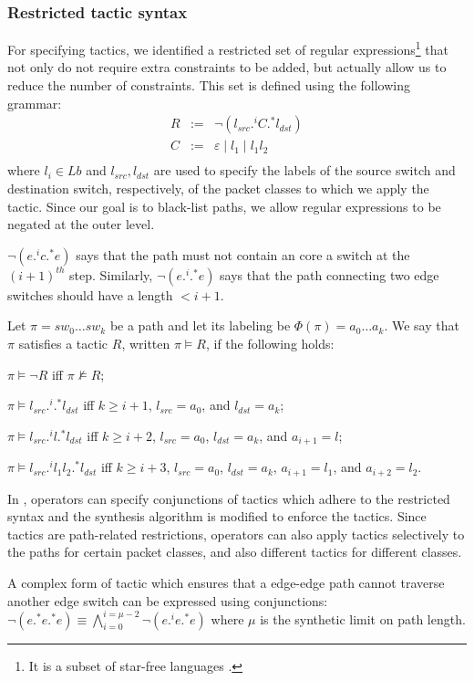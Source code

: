 \subsubsection{Restricted tactic syntax} 
For specifying tactics, we identified a restricted set of regular expressions\footnote{
	It is a subset of star-free languages \cite{}.}
 that not only do not require extra constraints to be added,
but actually allow us to reduce the number of constraints. 
This set is defined using the following grammar:
$$\begin{array}{rcl}
R  &  :=  &  \neg (l_{src} .^i C .^* l_{dst}) \\
C  &  :=  &  \varepsilon \mid l_1 \mid l_1 l_2\\
\end{array}$$
where $l_i\in Lb$ and $l_{src}, l_{dst}$ are used to specify the labels of the source switch 
and destination switch, respectively, of the packet classes to which we apply the tactic. 
Since our goal is to black-list paths, we allow regular expressions to be negated at the outer level. 
\begin{example}
 $\neg (e .^i c .^* e)$ says that the path must not contain an core a switch at the $(i+1)^{th}$ step. 
 Similarly, $\neg (e .^i .^* e)$ says that the path connecting two edge switches should have a length $ < i + 1$. 
\end{example}


Let $\pi = sw_0\ldots sw_k$ be a path and 
let its labeling be $\Phi(\pi)= a_0\ldots a_k$.
We say that $\pi$ satisfies a tactic $R$, written $\pi\models R$, if the following
holds:
\begin{compact2itemize}
\item $\pi \models \neg R$ iff $\pi \not\models R$;
\item $\pi \models  l_{src} .^i .^* l_{dst}$ iff $k\geq i+1$, $l_{src}= a_0$, and $l_{dst}= a_k$; 
\item $\pi \models  l_{src} .^i l.^* l_{dst}$ iff $k\geq i+2$, $l_{src}= a_0$, $l_{dst}= a_k$, and $a_{i+1}=l$;
\item $\pi \models  l_{src} .^i l_1 l_2.^* l_{dst}$ iff $k\geq i+3$, $l_{src}= a_0$, $l_{dst}= a_k$, $a_{i+1}=l_1$, and $a_{i+2}=l_2$.
\end{compact2itemize}
In \Name, operators can specify conjunctions of tactics which adhere to the restricted 
syntax and the synthesis algorithm is modified to enforce the tactics. 
Since tactics are path-related restrictions, 
operators can also apply tactics selectively to the paths for certain packet classes, and also different tactics for different classes. 
\begin{example}
A complex form of tactic which ensures that a edge-edge path
cannot traverse another edge switch can be expressed using conjunctions:
$\neg (e .^* e .^* e)\equiv \bigwedge \limits_{i=0}^{i=\mu-2} \neg (e .^i e .^* e)$ where $\mu$ is the synthetic limit on path length. 
\end{example}


